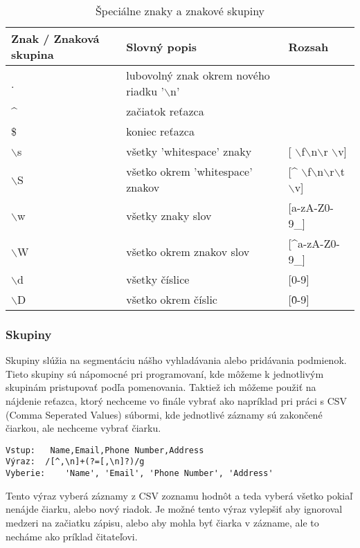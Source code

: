 \documentclass[10pt,twoside,slovak,a4paper]{article}
\begin{document}
\begin{table}[!ht]
	\centering
	 \begin{tabular}{|l|l|l|}
	\hline
		\textbf{Znak / Znaková skupina} & \textbf{Slovný popis} & \textbf{Rozsah} ~ \\ \hline
	        . & lubovolný znak okrem nového riadku '$\backslash$n' & ~ \\ \hline
        	\string^ & začiatok reťazca & ~ \\ \hline
        	\$ & koniec reťazca & ~ \\ \hline
	        $\backslash$s & všetky 'whitespace' znaky & [ $\backslash$f$\backslash$n$\backslash$r	$\backslash$v] \\ \hline
        	$\backslash$S & všetko okrem 'whitespace' znakov & [\string^ $\backslash$f$\backslash$n$\backslash$r$\backslash$t$\backslash$v] \\ \hline
	        $\backslash$w & všetky znaky slov & [a-zA-Z0-9\_] \\ \hline
	        $\backslash$W & všetko okrem znakov slov & [\string^a-zA-Z0-9\_] \\ \hline
        	$\backslash$d & všetky číslice & [0-9] \\ \hline
        	$\backslash$D & všetko okrem číslic & [\^0-9] \\ \hline
	\end{tabular}
	\caption{Špeciálne znaky a znakové skupiny}
\end{table}

\subsubsection{Skupiny}
Skupiny slúžia na segmentáciu nášho vyhladávania alebo pridávania podmienok.
Tieto skupiny sú nápomocné pri programovaní, kde môžeme k jednotlivým skupinám pristupovať podľa pomenovania.
Taktiež ich môžeme použiť na nájdenie reťazca, ktorý nechceme vo finále vybrať ako napríklad pri práci s CSV (Comma Seperated Values) súbormi, kde jednotlivé záznamy sú zakončené čiarkou, ale nechceme vybrať čiarku.

\begin{verbatim}
Vstup: 	 Name,Email,Phone Number,Address
Výraz:	/[^,\n]+(?=[,\n]?)/g
Vyberie:	'Name', 'Email', 'Phone Number', 'Address'
\end{verbatim}
Tento výraz vyberá záznamy z CSV zoznamu hodnôt a teda vyberá všetko pokiaľ nenájde čiarku, alebo nový riadok.
Je možné tento výraz vylepšiť aby ignoroval medzeri na začiatku zápisu, alebo aby mohla byť čiarka v zázname, ale to necháme ako príklad čitateľovi.
\end{document}
